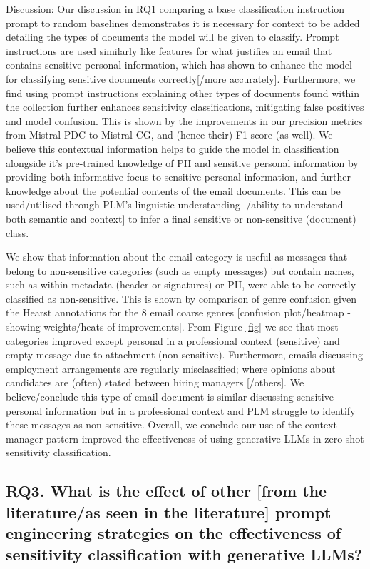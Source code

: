Discussion: Our discussion in RQ1 comparing a base classification instruction prompt to random baselines demonstrates it is necessary for context to be added detailing the types of documents the model will be given to classify. Prompt instructions are used similarly like features for what justifies an email that contains sensitive personal information, which has shown to enhance the model for classifying sensitive documents correctly[/more accurately]. Furthermore, we find using prompt instructions explaining other types of documents found within the collection further enhances sensitivity classifications, mitigating false positives and model confusion. This is shown by the improvements in our precision metrics from Mistral-PDC to Mistral-CG, and (hence their) F1 score (as well). We believe this contextual information helps to guide the model in classification alongside it’s pre-trained knowledge of PII and sensitive personal information by providing both informative focus to sensitive personal information, and further knowledge about the potential contents of the email documents. This can be used/utilised through PLM’s linguistic understanding [/ability to understand both semantic and context] to infer a final sensitive or non-sensitive (document) class.

We show that information about the email category is useful as messages that belong to non-sensitive categories (such as empty messages) but contain names, such as within metadata (header or signatures) or PII, were able to be correctly classified as non-sensitive. This is shown by comparison of genre confusion given the Hearst annotations for the 8 email coarse genres [confusion plot/heatmap - showing weights/heats of improvements]. From Figure \ref{fig} we see that most categories improved except personal in a professional context (sensitive) and empty message due to attachment (non-sensitive). Furthermore, emails discussing employment arrangements are regularly misclassified; where opinions about candidates are (often) stated between hiring managers [/others]. We believe/conclude this type of email document is similar discussing sensitive personal information but in a professional context and PLM struggle to identify these messages as non-sensitive. Overall, we conclude our use of the context manager pattern improved the effectiveness of using generative LLMs in zero-shot sensitivity classification.

\subsection{RQ3. What is the effect of other [from the literature/as seen in the literature] prompt engineering strategies on the effectiveness of sensitivity classification with generative LLMs?}

